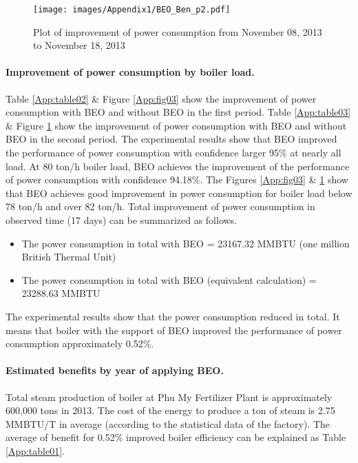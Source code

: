 \begin{figure}[H]
  \centering
  \texttt{[image: images/Appendix1/BEO\_Ben\_p2.pdf]}
  \caption{Plot of improvement of power consumption from November 08, 2013 to November 18, 2013}
  \label{App:fig04}    
\end{figure}

\paragraph{Improvement of power consumption by boiler load.}

Table \ref{App:table02} \& Figure \ref{App:fig03} show the improvement of power consumption with BEO and without BEO in the first period. Table \ref{App:table03} \& Figure \ref{App:fig04} show the improvement of power consumption with BEO and without BEO in the second period. The experimental results show that BEO improved the performance of power consumption with confidence larger 95\% at nearly all load. At 80 ton/h boiler load, BEO achieves the improvement of the performance of power consumption with confidence 94.18\%. The Figures \ref{App:fig03} \& \ref{App:fig04} show that BEO achieves good improvement in power consumption for boiler load below 78 ton/h and over 82 ton/h. Total improvement of power consumption in observed time (17 days) can be summarized as follows.

\begin{itemize}
\item The power consumption in total with BEO = 23167.32 MMBTU (one million British Thermal Unit)
\item The power consumption in total with BEO (equivalent calculation) = 23288.63 MMBTU
\end{itemize}

The experimental results show that the power consumption reduced in total. It means that boiler with the support of BEO improved the performance of power consumption approximately 0.52\%.

\paragraph{Estimated benefits by year of applying BEO.}

Total steam production of boiler at Phu My Fertilizer Plant is approximately 600,000 tons in 2013. The cost of the energy to produce a ton of steam is 2.75 MMBTU/T in average (according to the statistical data of the factory). The average of benefit for 0.52\% improved boiler efficiency can be explained as Table \ref{App:table01}.


